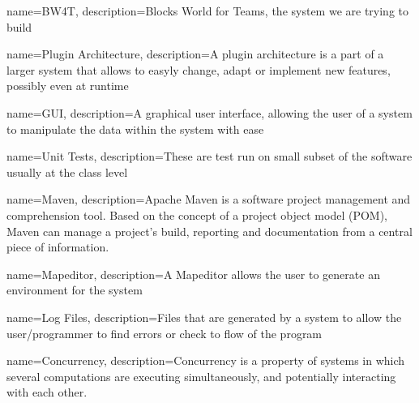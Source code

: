 {
    name=BW4T,
    description={Blocks World for Teams, the system we are trying to build}
}

{
    name={Plugin Architecture},
    description={A plugin architecture is a part of a larger system that allows to easyly change, adapt or implement new features, possibly even at runtime}
}

{
    name={GUI},
    description={A graphical user interface, allowing the user of a system to manipulate the data within the system with ease}
}

{
    name={Unit Tests},
    description={These are test run on small subset of the software usually at the class level}
}

{
    name={Maven},
    description={Apache Maven is a software project management and comprehension tool. Based on the concept of a project object model (POM), Maven can manage a project's build, reporting and documentation from a central piece of information.}
}

{
    name={Mapeditor},
    description={A Mapeditor allows the user to generate an environment for the system}
}

{
    name={Log Files},
    description={Files that are generated by a system to allow the user/programmer to find errors or check to flow of the program}
}

{
    name={Concurrency},
    description={Concurrency is a property of systems in which several computations are executing simultaneously, and potentially interacting with each other.}
}
